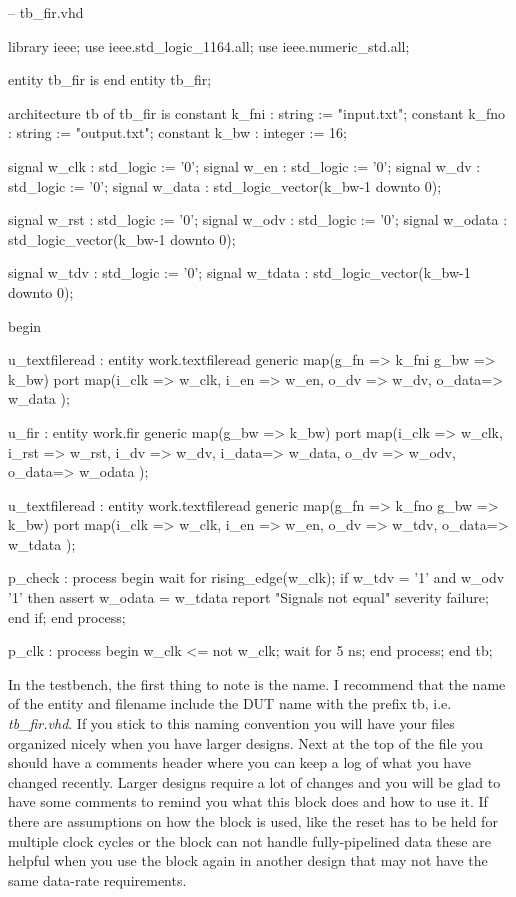 \begin{VHDLlisting}[tabsize=4]
-- tb_fir.vhd

library ieee;
	use ieee.std_logic_1164.all;
	use ieee.numeric_std.all;
	
entity tb_fir is
end entity tb_fir;

architecture tb of tb_fir is
    constant k_fni : string := "input.txt";
    constant k_fno : string := "output.txt";
    constant k_bw  : integer := 16;

    signal w_clk   : std_logic := '0';
    signal w_en    : std_logic := '0';
    signal w_dv    : std_logic := '0';
    signal w_data  : std_logic_vector(k_bw-1 downto 0);	
    
    signal w_rst   : std_logic := '0';
    signal w_odv   : std_logic := '0';
    signal w_odata : std_logic_vector(k_bw-1 downto 0);	
	
    signal w_tdv   : std_logic := '0';
    signal w_tdata : std_logic_vector(k_bw-1 downto 0);	
    
begin

    u_textfileread : entity work.textfileread
    generic map(g_fn => k_fni
                g_bw => k_bw)
    port map(i_clk => w_clk,
             i_en  => w_en,
             o_dv  => w_dv,
             o_data=> w_data	
    );
	
    u_fir : entity work.fir
    generic map(g_bw => k_bw)
    port map(i_clk => w_clk,
             i_rst => w_rst,
             i_dv  => w_dv,
             i_data=> w_data,
             o_dv  => w_odv,
             o_data=> w_odata	
    );

    u_textfileread : entity work.textfileread
    generic map(g_fn => k_fno
                g_bw => k_bw)
    port map(i_clk => w_clk,
             i_en  => w_en,
             o_dv  => w_tdv,
             o_data=> w_tdata	
    );
	
    p_check : process
    begin
        wait for rising_edge(w_clk);
        if w_tdv = '1' and w_odv '1' then
            assert w_odata = w_tdata
            report "Signals not equal"
            severity failure;
        end if;
    end process;
	
    p_clk : process
    begin	
        w_clk <= not w_clk;
        wait for 5 ns;
    end process;
end tb;
\end{VHDLlisting}

In the testbench, the first thing to note is the name. I recommend that the name of the entity and filename include the \ac{DUT} name with the prefix tb, i.e. \emph{tb\_fir.vhd}. If you stick to this naming convention you will have your files organized nicely when you have larger designs. Next at the top of the file you should have a comments header where you can keep a log of what you have changed recently. Larger designs require a lot of changes and you will be glad to have some comments to remind you what this block does and how to use it. If there are assumptions on how the block is used, like the reset has to be held for multiple clock cycles or the block can not handle fully-pipelined data these are helpful when you use the block again in another design that may not have the same data-rate requirements.

